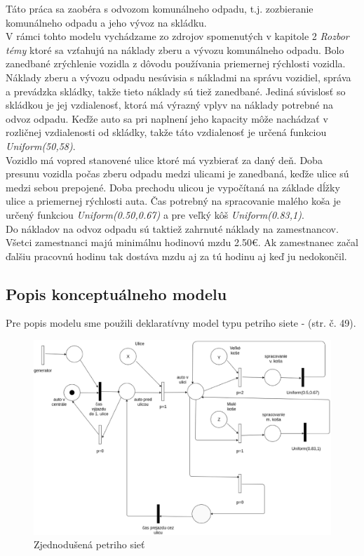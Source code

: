 \documentclass[11pt,a4paper]{article}
\begin{document}
    \indent Táto práca sa zaobéra s odvozom komunálneho odpadu, t.j. zozbieranie komunálneho odpadu a jeho vývoz na skládku.\\[0.4em]
    \indent V rámci tohto modelu vychádzame zo zdrojov spomenutých v kapitole 2 \textit{Rozbor témy} ktoré sa vzťahujú na náklady zberu a vývozu komunálneho odpadu. Bolo zanedbané zrýchlenie vozidla z dôvodu používania priemernej rýchlosti vozidla. Náklady zberu a vývozu odpadu nesúvisia s nákladmi na správu vozidiel, správa a prevádzka skládky, takže tieto náklady sú tiež zanedbané. Jediná súvislosť so skládkou je jej vzdialenosť, ktorá má výrazný vplyv na náklady potrebné na odvoz odpadu. Keďže auto sa pri naplnení jeho kapacity môže nachádzať v rozličnej vzdialenosti od skládky, takže táto vzdialenosť je určená funkciou \textit{Uniform(50,58)}.\\[0.4em]
    \indent Vozidlo má vopred stanovené ulice ktoré má vyzbierať za daný deň. Doba presunu vozidla počas zberu odpadu medzi ulicami je zanedbaná, keďže ulice sú medzi sebou prepojené. Doba prechodu ulicou je vypočítaná na základe dĺžky ulice a priemernej rýchlosti auta. Čas potrebný na spracovanie malého koša je určený funkciou \textit{Uniform(0.50,0.67)} a pre veľký kôš \textit{Uniform(0.83,1)}.\\[0.4em]
    \indent Do nákladov na odvoz odpadu sú taktiež zahrnuté náklady na zamestnancov. Všetci zamestnanci majú minimálnu hodinovú mzdu 2.50\euro{}. Ak zamestnanec začal ďalšiu pracovnú hodinu tak dostáva mzdu aj za tú hodinu aj keď ju nedokončil.

    \subsection{Popis konceptuálneho modelu}

        \indent Pre popis modelu sme použili deklaratívny model typu petriho siete - \cite{IMS}(str. č. 49).

\begin{figure}[h]
    \center
    \includegraphics[scale=0.3]{../pn/petrinet-small.eps}
    \caption{Zjednodušená petriho sieť}
    \label{P}
\end{figure}
\end{document}
